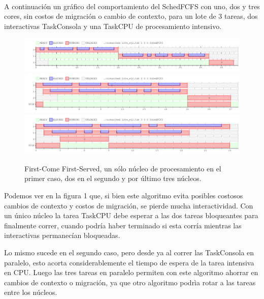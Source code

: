 ~

A continuación un gráfico del comportamiento del SchedFCFS con uno, dos y tres cores, sin costos de migración o cambio de contexto, para un lote de 3 tareas, dos interactivas TaskConsola y una TaskCPU de procesamiento intensivo.

\begin{figure}[H]
\centering\includegraphics[width=18 cm]{graficos/ej2FCFS1.png}
\centering\includegraphics[width=18 cm]{graficos/ej2FCFS2.png}
\centering\includegraphics[width=18 cm]{graficos/ej2FCFS3.png}
\caption{First-Come First-Served, un sólo núcleo de procesamiento en el primer caso, dos en el segundo y por último tres núcleos.}
\end{figure}

Podemos ver en la figura 1 que, si bien este algoritmo evita posibles costosos cambios de contexto y costos de migración, se pierde mucha interactividad. Con un único núcleo la tarea TaskCPU debe esperar a las dos tareas bloqueantes para finalmente correr, cuando podría haber terminado si esta corría mientras las interactivas permanecían bloqueadas.

Lo mismo sucede en el segundo caso, pero desde ya al correr las TaskConsola en paralelo, esto acorta considerablemente el tiempo de espera de la tarea intensiva en CPU. Luego las tres tareas en paralelo permiten con este algoritmo ahorrar en cambios de contexto o migración, ya que otro algoritmo podrìa rotar a las tareas entre los núcleos.



